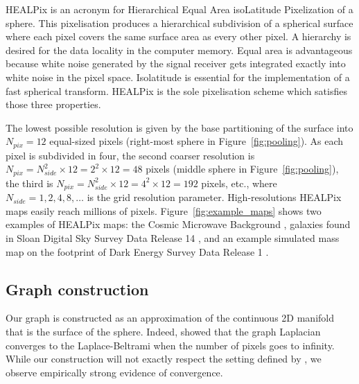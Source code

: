 \documentclass[final,twocolumn,3p,times,authoryear]{elsarticle}
\newcommand{\figref}[1]{Figure~\ref{fig:#1}}
\newcommand{\1}{\b{1}}              %
\newcommand{\0}{\b{0}}              %
\begin{document}
HEALPix is an acronym for Hierarchical Equal Area isoLatitude Pixelization of a sphere.
This pixelisation produces a hierarchical subdivision of a spherical surface where each pixel covers the same surface area as every other pixel.
A hierarchy is desired for the data locality in the computer memory.
Equal area is advantageous because white noise generated by the signal receiver gets integrated exactly into white noise in the pixel space.
Isolatitude is essential for the implementation of a fast spherical transform.
HEALPix is the sole pixelisation scheme which satisfies those three properties.

The lowest possible resolution is given by the base partitioning of the surface into $N_{pix} = 12$ equal-sized pixels (right-most sphere in \figref{pooling}).
As each pixel is subdivided in four, the second coarser resolution is $N_{pix} = N_{side}^2 \times 12 = 2^2 \times 12 = 48$ pixels (middle sphere in \figref{pooling}), the third is $N_{pix} = N_{side}^2 \times 12 = 4^2 \times 12 = 192$ pixels, etc., where $N_{side} = 1, 2, 4, 8, \ldots$ is the grid resolution parameter.
High-resolutions HEALPix maps easily reach millions of pixels.
\figref{example_maps} shows two examples of HEALPix maps: the Cosmic Microwave Background \citep{planck2015overview}, galaxies found in Sloan Digital Sky Survey Data Release 14 \citep{abolfathi2017sdssDR14}, and an example simulated mass map on the footprint of Dark Energy Survey Data Release 1 \citep{des2018dr1}.

\subsection{Graph construction}

Our graph is constructed as an approximation of the continuous 2D manifold that is the surface of the sphere.
Indeed, \citet{belkin2007convergence} showed that the graph Laplacian converges to the Laplace-Beltrami when the number of pixels goes to infinity.
While our construction will not exactly respect the setting defined by \citet{belkin2007convergence}, we observe empirically strong evidence of convergence.
\end{document}
